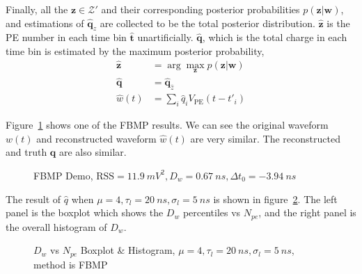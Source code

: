 Finally, all the $\bm{z} \in \mathcal{Z}'$ and their corresponding posterior probabilities $p(\bm{z}|\bm{w})$, and estimations of $\hat{\bm{q}}_z$ are collected to be the total posterior distribution. $\hat{\bm{z}}$ is the PE number in each time bin $\hat{\bm{t}}$ unartificially. $\hat{\bm{q}}$, which is the total charge in each time bin is estimated by the maximum posterior probability,
\begin{equation}
    \begin{aligned}
        \label{eq:zposterior}
        \hat{\bm{z}} &= \arg \underset{\bm{z}}{\max} p(\bm{z}|\bm{w}) \\
        \hat{\bm{q}} &= \hat{\bm{q}}_{\hat{z}} \\
        \hat{w}(t) &= \sum_{i} \hat{q}_i V_\mathrm{PE}(t-t'_i)
    \end{aligned}
\end{equation}

Figure~\ref{fig:fbmp} shows one of the FBMP results. We can see the original waveform $w(t)$ and reconstructed waveform $\hat{w}(t)$ are very similar. The reconstructed and truth $\bm{q}$ are also similar.

\begin{figure}[H]
    \centering
    \scalebox{0.4}{}
    \caption{\label{fig:fbmp} FBMP Demo, $\mathrm{RSS}=\SI{11.9}{mV^2},D_w=\SI{0.67}{ns},\Delta{t_0}=\SI{-3.94}{ns}$}
\end{figure}

The result of $\hat{q}$ when $\mu=4, \tau_l=\SI{20}{ns}, \sigma_l=\SI{5}{ns}$ is shown in figure~\ref{fig:fbmp-npe}. The left panel is the boxplot which shows the $D_w$ percentiles vs $N_{pe}$, and the right panel is the overall histogram of $D_w$. 

\begin{figure}[H]
    \centering
    \resizebox{0.5\textwidth}{!}{}
    \caption{\label{fig:fbmp-npe} $D_w$ vs $N_{pe}$ Boxplot \& Histogram, $\mu=4, \tau_l=\SI{20}{ns}, \sigma_l=\SI{5}{ns}$, method is FBMP}
\end{figure}

